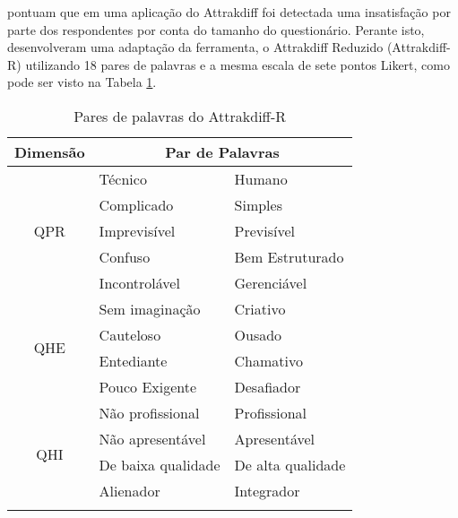  pontuam que em uma aplicação do Attrakdiff foi detectada uma insatisfação por parte dos respondentes por conta do tamanho 
do questionário. Perante isto, desenvolveram uma adaptação da ferramenta, o Attrakdiff Reduzido (Attrakdiff-R) utilizando 18 pares de palavras e a mesma 
escala de sete pontos Likert, como pode ser visto na Tabela \ref{tab02}.

\begin{table}[h]
    \centering
    \caption{Pares de palavras do Attrakdiff-R}
    \label{tab02}
    \begin{tabular}{|c|ll|}
    \hline
    Dimensão             & \multicolumn{2}{c|}{Par de Palavras}                                 \\ \hline
    \multirow{5}{*}{QPR} & \multicolumn{1}{l|}{Técnico}                 & Humano                \\ \cline{2-3} 
                         & \multicolumn{1}{l|}{Complicado}              & Simples               \\ \cline{2-3} 
                         & \multicolumn{1}{l|}{Imprevisível}            & Previsível            \\ \cline{2-3} 
                         & \multicolumn{1}{l|}{Confuso}                 & Bem Estruturado       \\ \cline{2-3} 
                         & \multicolumn{1}{l|}{Incontrolável}           & Gerenciável           \\ \hline
    \multirow{4}{*}{QHE} & \multicolumn{1}{l|}{Sem imaginação}          & Criativo              \\ \cline{2-3} 
                         & \multicolumn{1}{l|}{Cauteloso}               & Ousado                \\ \cline{2-3} 
                         & \multicolumn{1}{l|}{Entediante}              & Chamativo             \\ \cline{2-3} 
                         & \multicolumn{1}{l|}{Pouco Exigente}          & Desafiador            \\ \hline
    \multirow{5}{*}{QHI} & \multicolumn{1}{l|}{Não profissional}        & Profissional          \\ \cline{2-3} 
                         & \multicolumn{1}{l|}{Não apresentável}        & Apresentável          \\ \cline{2-3} 
                         & \multicolumn{1}{l|}{De baixa qualidade}      & De alta qualidade     \\ \cline{2-3} 
                         & \multicolumn{1}{l|}{Alienador}               & Integrador            \\ \cline{2-3} 

\end{tabular}
\end{table}
